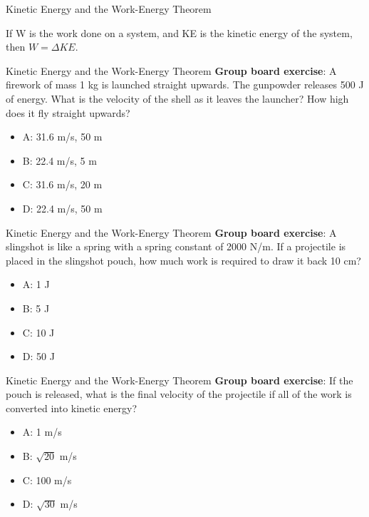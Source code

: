 \documentclass{beamer}
\begin{document}
\begin{frame}{Kinetic Energy and the Work-Energy Theorem}
\begin{tcolorbox}[colback=white,colframe=red!40!blue,title=The Work-Energy Theorem]
\alert{If W is the work done on a system, and KE is the kinetic energy of the system, then $W = \Delta KE$.}
\end{tcolorbox}
\end{frame}

\begin{frame}{Kinetic Energy and the Work-Energy Theorem}
\textbf{Group board exercise}: A firework of mass 1 kg is launched straight upwards.  The gunpowder releases 500 J of energy.  What is the velocity of the shell as it leaves the launcher?  How high does it fly straight upwards?
\begin{itemize}
\item A: 31.6 m/s, 50 m
\item B: 22.4 m/s, 5 m
\item C: 31.6 m/s, 20 m
\item D: 22.4 m/s, 50 m
\end{itemize}
\end{frame}

\begin{frame}{Kinetic Energy and the Work-Energy Theorem}
\textbf{Group board exercise}: A slingshot is like a spring with a spring constant of 2000 N/m.  If a projectile is placed in the slingshot pouch, how much work is required to draw it back 10 cm?
\begin{itemize}
\item A: 1 J
\item B: 5 J
\item C: 10 J
\item D: 50 J
\end{itemize}
\end{frame}

\begin{frame}{Kinetic Energy and the Work-Energy Theorem}
\textbf{Group board exercise}: If the pouch is released, what is the final velocity of the projectile if all of the work is converted into kinetic energy?
\begin{itemize}
\item A: 1 m/s
\item B: $\sqrt{20}$ m/s
\item C: 100 m/s
\item D: $\sqrt{30}$ m/s
\end{itemize}
\end{frame}
\end{document}
